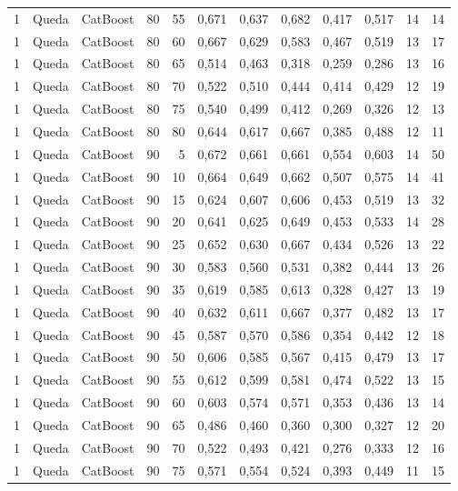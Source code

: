 \begin{longtable}{@{}rllrrrrrrrrr@{}}
1 & Queda & CatBoost & 80 & 55 & 0,671 & 0,637 & 0,682 & 0,417 & 0,517 & 14 & 14 \\
1 & Queda & CatBoost & 80 & 60 & 0,667 & 0,629 & 0,583 & 0,467 & 0,519 & 13 & 17 \\
1 & Queda & CatBoost & 80 & 65 & 0,514 & 0,463 & 0,318 & 0,259 & 0,286 & 13 & 16 \\
1 & Queda & CatBoost & 80 & 70 & 0,522 & 0,510 & 0,444 & 0,414 & 0,429 & 12 & 19 \\
1 & Queda & CatBoost & 80 & 75 & 0,540 & 0,499 & 0,412 & 0,269 & 0,326 & 12 & 13 \\
1 & Queda & CatBoost & 80 & 80 & 0,644 & 0,617 & 0,667 & 0,385 & 0,488 & 12 & 11 \\
1 & Queda & CatBoost & 90 & 5 & 0,672 & 0,661 & 0,661 & 0,554 & 0,603 & 14 & 50 \\
1 & Queda & CatBoost & 90 & 10 & 0,664 & 0,649 & 0,662 & 0,507 & 0,575 & 14 & 41 \\
1 & Queda & CatBoost & 90 & 15 & 0,624 & 0,607 & 0,606 & 0,453 & 0,519 & 13 & 32 \\
1 & Queda & CatBoost & 90 & 20 & 0,641 & 0,625 & 0,649 & 0,453 & 0,533 & 14 & 28 \\
1 & Queda & CatBoost & 90 & 25 & 0,652 & 0,630 & 0,667 & 0,434 & 0,526 & 13 & 22 \\
1 & Queda & CatBoost & 90 & 30 & 0,583 & 0,560 & 0,531 & 0,382 & 0,444 & 13 & 26 \\
1 & Queda & CatBoost & 90 & 35 & 0,619 & 0,585 & 0,613 & 0,328 & 0,427 & 13 & 19 \\
1 & Queda & CatBoost & 90 & 40 & 0,632 & 0,611 & 0,667 & 0,377 & 0,482 & 13 & 17 \\
1 & Queda & CatBoost & 90 & 45 & 0,587 & 0,570 & 0,586 & 0,354 & 0,442 & 12 & 18 \\
1 & Queda & CatBoost & 90 & 50 & 0,606 & 0,585 & 0,567 & 0,415 & 0,479 & 13 & 17 \\
1 & Queda & CatBoost & 90 & 55 & 0,612 & 0,599 & 0,581 & 0,474 & 0,522 & 13 & 15 \\
1 & Queda & CatBoost & 90 & 60 & 0,603 & 0,574 & 0,571 & 0,353 & 0,436 & 13 & 14 \\
1 & Queda & CatBoost & 90 & 65 & 0,486 & 0,460 & 0,360 & 0,300 & 0,327 & 12 & 20 \\
1 & Queda & CatBoost & 90 & 70 & 0,522 & 0,493 & 0,421 & 0,276 & 0,333 & 12 & 16 \\
1 & Queda & CatBoost & 90 & 75 & 0,571 & 0,554 & 0,524 & 0,393 & 0,449 & 11 & 15 \\

\end{longtable}
